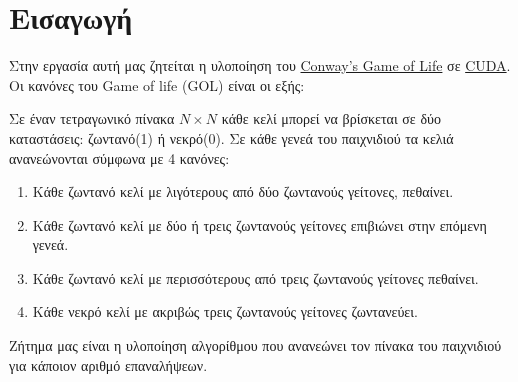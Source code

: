 \chapter{Εισαγωγή}

Στην εργασία αυτή μας ζητείται η υλοποίηση του
\href{https://en.wikipedia.org/wiki/Conway%27s_Game_of_Life}{Conway's Game of Life}
σε \href{https://en.wikipedia.org/wiki/CUDA}{CUDA}.
Οι κανόνες του Game of life (GOL) είναι οι εξής:

Σε έναν τετραγωνικό πίνακα $N \times N$ κάθε κελί μπορεί να βρίσκεται σε δύο καταστάσεις: 
ζωντανό(1) ή νεκρό(0).
Σε κάθε γενεά του παιχνιδιού τα κελιά ανανεώνονται σύμφωνα με 4 κανόνες: 
\begin{enumerate}
\item Κάθε ζωντανό κελί με λιγότερους από δύο ζωντανούς γείτονες, πεθαίνει.
\item Κάθε ζωντανό κελί με δύο ή τρεις ζωντανούς γείτονες επιβιώνει στην επόμενη γενεά.
\item Κάθε ζωντανό κελί με περισσότερους από τρεις ζωντανούς γείτονες πεθαίνει.
\item Κάθε νεκρό κελί με ακριβώς τρεις ζωντανούς γείτονες ζωντανεύει.
\end{enumerate}

Ζήτημα μας είναι η υλοποίηση αλγορίθμου που ανανεώνει τον πίνακα του παιχνιδιού για κάποιον αριθμό επαναλήψεων.